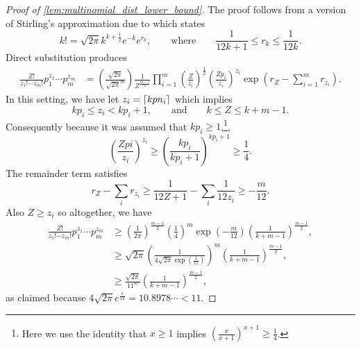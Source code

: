 \documentclass[notitlepage, 10pt]{article}
\begin{document}
\begin{proof}[Proof of \cref{lem:multinomial_dist_lower_bound}]
    The proof follows from a version of Stirling's approximation due to \citeauthor{robbins1955remark} \cite{robbins1955remark} which states
    \begin{equation}
        k! = \sqrt{2\pi} k^{k+\frac{1}{2}} e^{-k} e^{r_k},
        \qquad
        \text{where}
        \qquad
        \frac{1}{12k+1}\leq r_k \leq \frac{1}{12k}.
    \end{equation}
    Direct substitution produces
    \begin{align}
        \frac{Z!}{z_1! \cdots z_m!}p_1^{z_{1}}\cdots p_{m}^{z_{m}}
        &=\left(\frac{\sqrt{2\pi}}{\sqrt{2\pi}^m}\right)\frac{1}{Z^{\frac{m-1}{2}}}\prod_{i=1}^{m}\left(\frac{Z}{z_i}\right)^{\frac{1}{2}}\left(\frac{Zp_i}{z_i}\right)^{z_i}\exp\left(r_{Z} - \sum_{i=1}^{m} r_{z_i}\right).
    \end{align}
    In this setting, we have let $z_i = \left\lceil k pn_i\right\rceil$ which implies
    \begin{equation}
        kp_i \leq z_i < kp_i + 1,
        \qquad \text{and} \qquad
        k \leq Z \leq k+m-1.
    \end{equation}
    Consequently because it was assumed that $kp_i \geq 1$,\footnote{Here we use the identity that $x \geq 1$ implies $\left(\frac{x}{x+1}\right)^{x+1} \geq \frac{1}{4}$.},
    \begin{equation}
        \left(\frac{Zpi}{z_i}\right)^{z_i}
        \geq \left(\frac{kp_i}{kp_i+1}\right)^{kp_i+1} \geq \frac{1}{4}.
    \end{equation}
    The remainder term satisfies
    \begin{equation}
        r_{Z} - \sum_{i} r_{z_i} \geq \frac{1}{12Z + 1} - \sum_{i}\frac{1}{12z_i} \geq - \frac{m}{12}.
    \end{equation}
    Also $Z \geq z_i$ so altogether, we have
    \begin{align}
        \frac{Z!}{z_1! \cdots z_m!}p_1^{z_{1}}\cdots p_{m}^{z_{m}}
        &\geq \left(\frac{1}{2\pi}\right)^{\frac{m-1}{2}}\left(\frac{1}{4}\right)^{m}\exp\left(-\frac{m}{12}\right) \left(\frac{1}{k+m-1}\right)^{\frac{m-1}{2}}, \\
        &\geq \sqrt{2\pi}\left(\frac{1}{4\sqrt{2\pi}\exp(\frac{1}{12})}\right)^{m}\left(\frac{1}{k+m-1}\right)^{\frac{m-1}{2}}, \\
        &\geq \frac{\sqrt{2\pi}}{11^m}\left(\frac{1}{k+m-1}\right)^{\frac{m-1}{2}},
    \end{align}
    as claimed because $4\sqrt{2\pi}e^{\frac{1}{12}} = 10.8978\cdots < 11$.
\end{proof}
\end{document}

